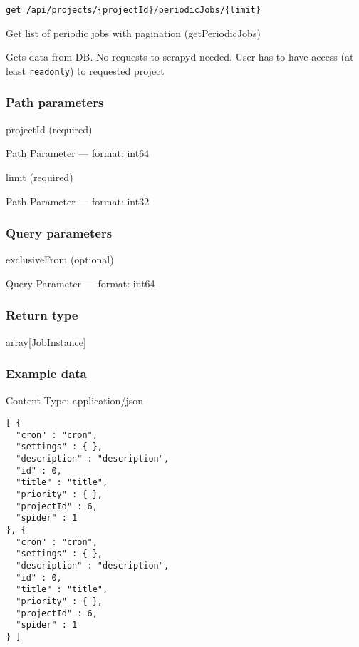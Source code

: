 \begin{verbatim}
get /api/projects/{projectId}/periodicJobs/{limit}
\end{verbatim}

Get list of periodic jobs with pagination ({getPeriodicJobs})

Gets data from DB. No requests to scrapyd needed. User has to have
access (at least \texttt{readonly}) to requested project

\hypertarget{path-parameters-14}{%
\subsubsection*{Path parameters}\label{path-parameters-14}}

projectId (required)

{Path Parameter} --- format: int64

limit (required)

{Path Parameter} --- format: int32

\hypertarget{query-parameters-2}{%
\subsubsection*{Query parameters}\label{query-parameters-2}}

exclusiveFrom (optional)

{Query Parameter} --- format: int64

\hypertarget{return-type-16}{%
\subsubsection*{Return type}\label{return-type-16}}

array{[}\protect\hyperlink{JobInstance}{JobInstance}{]}

\hypertarget{example-data-16}{%
\subsubsection*{Example data}\label{example-data-16}}

Content-Type: application/json

\begin{verbatim}
[ {
  "cron" : "cron",
  "settings" : { },
  "description" : "description",
  "id" : 0,
  "title" : "title",
  "priority" : { },
  "projectId" : 6,
  "spider" : 1
}, {
  "cron" : "cron",
  "settings" : { },
  "description" : "description",
  "id" : 0,
  "title" : "title",
  "priority" : { },
  "projectId" : 6,
  "spider" : 1
} ]
\end{verbatim}

